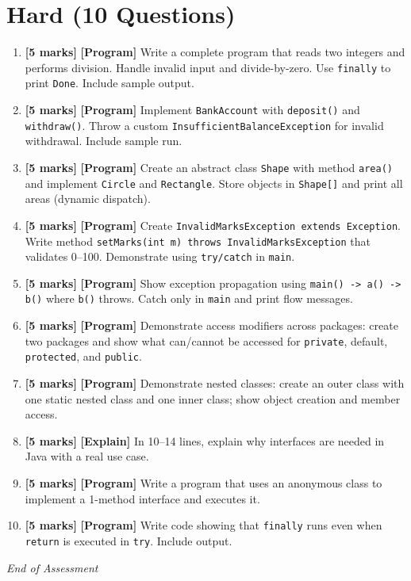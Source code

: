 \documentclass[11pt,a4paper]{article}
\newcommand{\HMarks}{\textbf{[5 marks]} }
\begin{document}
\section*{Hard (10 Questions)}
\begin{enumerate}[label=\textbf{H\arabic*.}, leftmargin=*]
  \item \HMarks \textbf{[Program]} Write a complete program that reads two integers and performs division.
    Handle invalid input and divide-by-zero. Use \texttt{finally} to print \texttt{Done}. Include sample output.

  \item \HMarks \textbf{[Program]} Implement \texttt{BankAccount} with \texttt{deposit()} and \texttt{withdraw()}.
    Throw a custom \texttt{InsufficientBalanceException} for invalid withdrawal. Include sample run.

  \item \HMarks \textbf{[Program]} Create an abstract class \texttt{Shape} with method \texttt{area()} and implement \texttt{Circle} and \texttt{Rectangle}.
    Store objects in \texttt{Shape[]} and print all areas (dynamic dispatch).

  \item \HMarks \textbf{[Program]} Create \texttt{InvalidMarksException extends Exception}.
    Write method \texttt{setMarks(int m) throws InvalidMarksException} that validates 0--100.
    Demonstrate using \texttt{try/catch} in \texttt{main}.

  \item \HMarks \textbf{[Program]} Show exception propagation using \texttt{main() -> a() -> b()} where \texttt{b()} throws.
    Catch only in \texttt{main} and print flow messages.

  \item \HMarks \textbf{[Program]} Demonstrate access modifiers across packages:
    create two packages and show what can/cannot be accessed for \texttt{private}, default, \texttt{protected}, and \texttt{public}.

  \item \HMarks \textbf{[Program]} Demonstrate nested classes:
    create an outer class with one static nested class and one inner class; show object creation and member access.

  \item \HMarks \textbf{[Explain]} In 10--14 lines, explain why interfaces are needed in Java with a real use case.

  \item \HMarks \textbf{[Program]} Write a program that uses an anonymous class to implement a 1-method interface and executes it.

  \item \HMarks \textbf{[Program]} Write code showing that \texttt{finally} runs even when \texttt{return} is executed in \texttt{try}.
    Include output.
\end{enumerate}

\vfill
\noindent\textit{End of Assessment}
\end{document}
